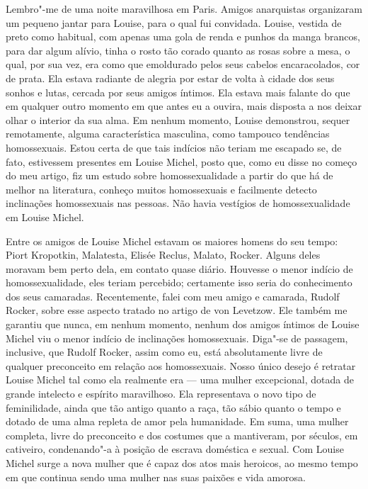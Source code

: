 Lembro"-me de uma noite maravilhosa em Paris. Amigos anarquistas
organizaram um pequeno jantar para Louise, para o qual fui convidada.
Louise, vestida de preto como habitual, com apenas uma gola de renda e
punhos da manga brancos, para dar algum alívio, tinha o rosto tão corado
quanto as rosas sobre a mesa, o qual, por sua vez, era como que
emoldurado pelos seus cabelos encaracolados, cor de prata. Ela estava
radiante de alegria por estar de volta à cidade dos seus sonhos e lutas,
cercada por seus amigos íntimos. Ela estava mais falante do que em
qualquer outro momento em que antes eu a ouvira, mais disposta a nos
deixar olhar o interior da sua alma. Em nenhum momento, Louise
demonstrou, sequer remotamente, alguma característica masculina, como
tampouco tendências homossexuais. Estou certa de que tais indícios não
teriam me escapado se, de fato, estivessem presentes em Louise Michel,
posto que, como eu disse no começo do meu artigo, fiz um estudo sobre
homossexualidade a partir do que há de melhor na literatura, conheço muitos
homossexuais e facilmente detecto inclinações homossexuais nas pessoas.
Não havia vestígios de homossexualidade em Louise Michel.

Entre os amigos de Louise Michel estavam os maiores homens do seu tempo:
Piort Kropotkin, Malatesta, Elisée Reclus, Malato, Rocker. Alguns deles
moravam bem perto dela, em contato quase diário. Houvesse o menor
indício de homossexualidade, eles teriam percebido; certamente isso
seria do conhecimento dos seus camaradas. Recentemente, falei com meu
amigo e camarada, Rudolf Rocker, sobre esse aspecto tratado no artigo de
von Levetzow. Ele também me garantiu que nunca, em nenhum momento,
nenhum dos amigos íntimos de Louise Michel viu o menor indício de
inclinações homossexuais. Diga"-se de passagem, inclusive, que Rudolf
Rocker, assim como eu, está absolutamente livre de qualquer preconceito
em relação aos homossexuais. Nosso único desejo é retratar Louise Michel
tal como ela realmente era --- uma mulher excepcional, dotada de grande
intelecto e espírito maravilhoso. Ela representava o novo tipo de
feminilidade, ainda que tão antigo quanto a raça, tão sábio quanto o
tempo e dotado de uma alma repleta de amor pela humanidade. Em suma, uma
mulher completa, livre do preconceito e dos costumes que a mantiveram, por séculos, em cativeiro, condenando"-a à posição de escrava
doméstica e sexual. Com Louise Michel surge a nova mulher que é capaz
dos atos mais heroicos, ao mesmo tempo em que continua sendo uma mulher
nas suas paixões e vida amorosa.

